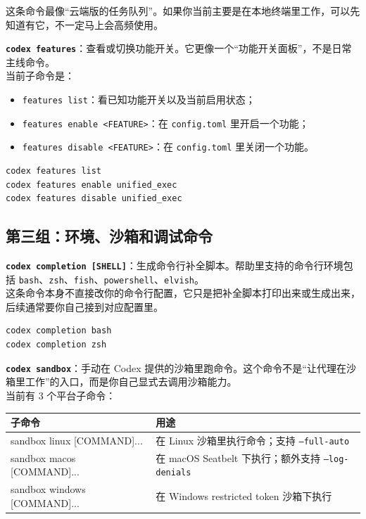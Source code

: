 \documentclass[UTF8,a4paper,12pt]{ctexart}
\begin{document}
这条命令最像“云端版的任务队列”。如果你当前主要是在本地终端里工作，可以先知道有它，不一定马上会高频使用。

\medskip
\textbf{\texttt{codex features}}：查看或切换功能开关。它更像一个“功能开关面板”，不是日常主线命令。\\
当前子命令是：
\begin{itemize}
  \item \texttt{features list}：看已知功能开关以及当前启用状态；
  \item \texttt{features enable <FEATURE>}：在 \texttt{config.toml} 里开启一个功能；
  \item \texttt{features disable <FEATURE>}：在 \texttt{config.toml} 里关闭一个功能。
\end{itemize}

\begin{lstlisting}[style=cli]
codex features list
codex features enable unified_exec
codex features disable unified_exec
\end{lstlisting}

\subsection{第三组：环境、沙箱和调试命令}

\textbf{\texttt{codex completion [SHELL]}}：生成命令行补全脚本。帮助里支持的命令行环境包括 \texttt{bash}、\texttt{zsh}、\texttt{fish}、\texttt{powershell}、\texttt{elvish}。\\
这条命令本身不直接改你的命令行配置，它只是把补全脚本打印出来或生成出来，后续通常要你自己接到对应配置里。

\begin{lstlisting}[style=cli]
codex completion bash
codex completion zsh
\end{lstlisting}

\medskip
\textbf{\texttt{codex sandbox}}：手动在 Codex 提供的沙箱里跑命令。这个命令不是“让代理在沙箱里工作”的入口，而是你自己显式去调用沙箱能力。\\
当前有 3 个平台子命令：

\begin{longtable}{>{\ttfamily\raggedright\arraybackslash}p{} >{\raggedright\arraybackslash}p{}}
\toprule
子命令 & 用途 \\
\midrule
\endhead
sandbox linux [COMMAND]... & 在 Linux 沙箱里执行命令；支持 \texttt{--full-auto} \\
sandbox macos [COMMAND]... & 在 macOS Seatbelt 下执行；额外支持 \texttt{--log-denials} \\
sandbox windows [COMMAND]... & 在 Windows restricted token 沙箱下执行 \\
\bottomrule
\end{longtable}
\end{document}
